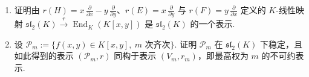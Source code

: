 \begin{numpara}[特征为零时 $\mathfrak{g} = \mathfrak{sl}_2$ 的不可约表示]
\begin{exercise*}
\begin{enumerate}[label=\roman*)]
\item 证明由 $r(H) = x\,\frac{\partial}{\partial x} - y\,\frac{\partial}{\partial y}$、$r(E) = x\,\frac{\partial}{\partial y}$ 与 $r(F) = y\,\frac{\partial}{\partial x}$ 定义的 $K$-线性映射 $\mathfrak{sl}_2(K) \xrightarrow{\ r\ } \operatorname{End}_K(K[x, y])$ 是 $\mathfrak{sl}_2(K)$ 的一个表示.
\item 设 $\mathcal{P}_m := \{f(x, y) \in K[x, y],\ \text{$m$ 次齐次}\}$. 证明 $\mathcal{P}_m$ 在 $\mathfrak{sl}_2(K)$ 下稳定，且如此得到的表示 $(\mathcal{P}_m, r)$ 同构于表示 $(V_m, r_m)$，即最高权为 $m$ 的不可约表示.
\end{enumerate}
\end{exercise*}
\end{numpara}
